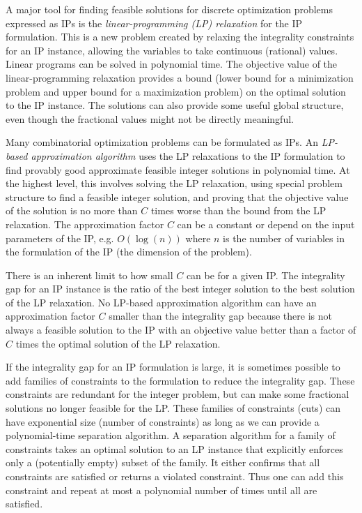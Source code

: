 \iffalse
However, there is substantial research into finding a feasible, provably-good approximate, and even (computationally) provably optimal solutions to specific IP instances. 
There is substantial research into finding a feasible, provably-good approximate solution for TODO, and even (computationally) provably optimal solutions to specific IP instances. \cindy{TODO: probably need to informally distinguish between a IP for a general problem, and a specific instance when the parameters are set.}
\fi

A major tool for finding feasible solutions for discrete optimization problems expressed as IPs is the {\em linear-programming (LP) relaxation} for the IP formulation. This is a new problem created by relaxing the integrality constraints for an IP instance, allowing the variables to take continuous (rational) values. Linear programs can be solved in polynomial time. The objective value of the linear-programming relaxation provides a bound (lower bound for a minimization problem and upper bound for a maximization problem) on the optimal solution to the IP instance. The solutions can also provide some useful global structure, even though the fractional values might not be directly meaningful. 

Many combinatorial optimization problems can be formulated as IPs. An {\em LP-based approximation algorithm} uses the LP relaxations to the IP formulation to find provably good approximate feasible integer solutions in polynomial time. At the highest level, this involves solving the LP relaxation, using special  problem structure to find a feasible integer solution, and proving that the objective value of the solution is no more than $C$ times worse than the bound from the LP relaxation. The approximation factor $C$ can be a constant or depend on the input parameters of the IP, e.g. $O(\log(n))$ where $n$ is the number of variables in the formulation of the IP (the dimension of the problem).

There is an inherent limit to how small $C$ can be for a given IP. The integrality gap for an IP instance is the ratio of the best integer solution to the best solution of the LP relaxation. No LP-based approximation algorithm can have an approximation factor $C$ smaller than the integrality gap because there is not always a feasible solution to the IP with an objective value better than a factor of $C$ times the optimal solution of the LP relaxation.

If the integrality gap for an IP formulation is large, it is sometimes possible to add families of constraints to the formulation to reduce the integrality gap.  These constraints are redundant for the integer problem, but can make some fractional solutions no longer feasible for the LP. These families of constraints (cuts) can have exponential size (number of constraints) as long as we can provide a polynomial-time separation algorithm. A separation algorithm for a family of constraints takes an optimal solution to an LP instance that explicitly enforces only a (potentially empty) subset of the family. It either confirms that all constraints are satisfied or returns a violated constraint. Thus one can add this constraint and repeat at most a polynomial number of times until all are satisfied.

